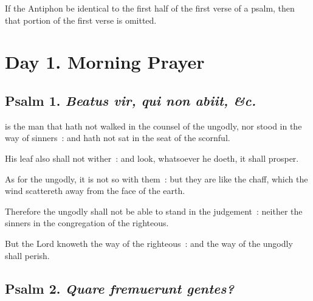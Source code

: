 
\begin{secrubric}
	If the Antiphon be identical to the first half of the first verse of a psalm, then that portion of the first verse is omitted.
\end{secrubric}

\section*{Day 1. Morning Prayer}

\subsection{Psalm 1. \textit{Beatus vir, qui non abiit, \&c.}}


 is the man that hath not walked in the counsel of the ungodly, nor stood in the way of sinners~: and hath not sat in the seat of the scornful.\par
{}
His leaf also shall not wither~: and look, whatsoever he doeth, it shall prosper.\par
{}As for the ungodly, it is not so with them~: but they are like the chaff, which the wind scattereth away from the face of the earth.\par
{}Therefore the ungodly shall not be able to stand in the judgement~: neither the sinners in the congregation of the righteous.\par
{}But the Lord knoweth the way of the righteous~: and the way of the ungodly shall perish.\par

\subsection{Psalm 2. \textit{Quare fremuerunt gentes?}}


